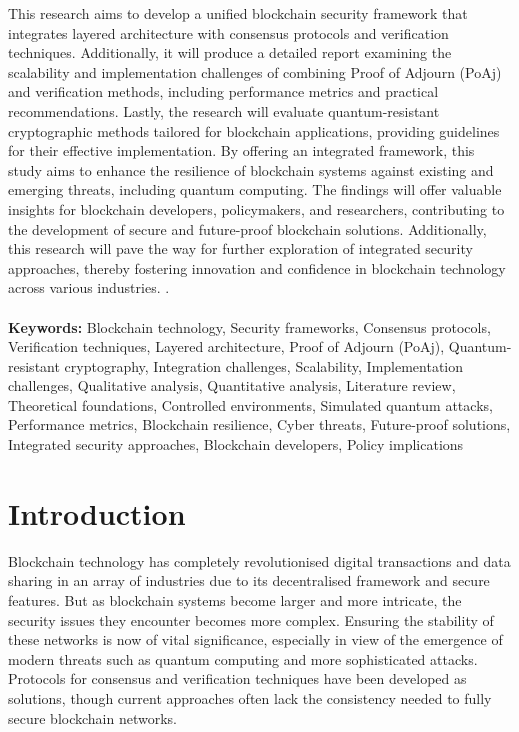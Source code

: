 \documentclass[a4paper, 12pt]{article}
\begin{document}
This research aims to develop a unified blockchain security framework that integrates layered architecture with consensus protocols and verification techniques. Additionally, it will produce a detailed report examining the scalability and implementation challenges of combining Proof of Adjourn (PoAj) and verification methods, including performance metrics and practical recommendations. Lastly, the research will evaluate quantum-resistant cryptographic methods tailored for blockchain applications, providing guidelines for their effective implementation. By offering an integrated framework, this study aims to enhance the resilience of blockchain systems against existing and emerging threats, including quantum computing. The findings will offer valuable insights for blockchain developers, policymakers, and researchers, contributing to the development of secure and future-proof blockchain solutions. Additionally, this research will pave the way for further exploration of integrated security approaches, thereby fostering innovation and confidence in blockchain technology across various industries.
\cite{kushwaha}.
\hfill
\\
\\
\textbf{Keywords:} Blockchain technology, Security frameworks, Consensus protocols, Verification techniques, Layered architecture, Proof of Adjourn (PoAj), Quantum-resistant cryptography, Integration challenges, Scalability, Implementation challenges, Qualitative analysis, Quantitative analysis, Literature review, Theoretical foundations, Controlled environments, Simulated quantum attacks, Performance metrics, Blockchain resilience, Cyber threats, Future-proof solutions, Integrated security approaches, Blockchain developers, Policy implications \\

\section{Introduction}
Blockchain technology has completely revolutionised digital transactions and data sharing in an array of industries due to its decentralised framework and secure features. But as blockchain systems become larger and more intricate, the security issues they encounter becomes more complex. Ensuring the stability of these networks is now of vital significance, especially in view of the emergence of modern threats such as quantum computing and more sophisticated attacks. Protocols for consensus and verification techniques have been developed as solutions, though current approaches often lack the consistency needed to fully secure blockchain networks.\\
\end{document}
